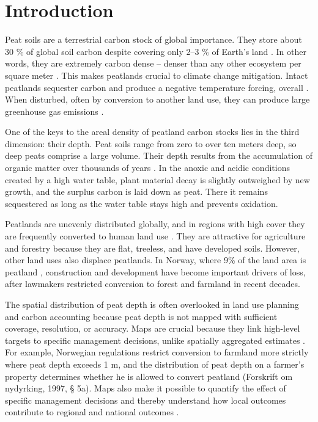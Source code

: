 \documentclass[soil, manuscript]{copernicus}
\begin{document}
\section{Introduction}

Peat soils are a terrestrial carbon stock of global importance.
They store about 30 \% of global soil carbon despite covering only 2--3 \% of Earth's land \citep{xuPEATMAPRefiningEstimates2018, friedlingsteinGlobalCarbonBudget2020, unepGlobalPeatlandsAssessment2022}.
In other words, they are extremely carbon dense -- denser than any other ecosystem per square meter \citep{temminkRecoveringWetlandBiogeomorphic2022}.
This makes peatlands crucial to climate change mitigation.
Intact peatlands sequester carbon and produce a negative temperature forcing, overall \citep{joostenRolePeatlandsClimate2016}.
When disturbed, often by conversion to another land use, they can produce large greenhouse gas emissions \citep{maGloballyRobustRelationship2022}.

One of the keys to the areal density of peatland carbon stocks lies in the third dimension: their depth.
Peat soils range from zero to over ten meters deep, so deep peats comprise a large volume.
Their depth results from the accumulation of organic matter over thousands of years \citep{loiselDatabaseSynthesisNorthern2014, joostenRolePeatlandsClimate2016}.
In the anoxic and acidic conditions created by a high water table, plant material decay is slightly outweighed by new growth, and the surplus carbon is laid down as peat.
There it remains sequestered as long as the water table stays high and prevents oxidation.

Peatlands are unevenly distributed globally, and in regions with high cover they are frequently converted to human land use \citep{unepGlobalPeatlandsAssessment2022}.
They are attractive for agriculture and forestry because they are flat, treeless, and have developed soils.
However, other land uses also displace peatlands.
In Norway, where 9\% of the land area is peatland \citep{brynLandCoverNorway2018}, construction and development have become important drivers of loss, after lawmakers restricted conversion to forest and farmland in recent decades.

The spatial distribution of peat depth is often overlooked in land use planning and carbon accounting because peat depth is not mapped with sufficient coverage, resolution, or accuracy.
Maps are crucial because they link high-level targets to specific management decisions, unlike spatially aggregated estimates \citep{oecdOECDEnvironmentalPerformance2022}.
For example, Norwegian regulations restrict conversion to farmland more strictly where peat depth exceeds 1 m, and the distribution of peat depth on a farmer's property determines whether he is allowed to convert peatland (Forskrift om nydyrking, 1997, § 5a).
Maps also make it possible to quantify the effect of specific management decisions and thereby understand how local outcomes contribute to regional and national outcomes \citep{oecdOECDEnvironmentalPerformance2022}.
\end{document}
